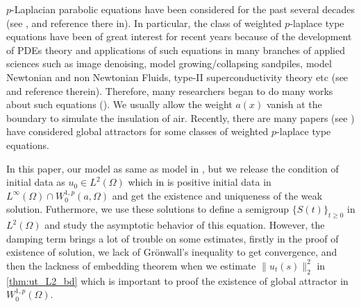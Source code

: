 \documentclass[11pt]{amsart}
\theoremstyle{definition}
\numberwithin{equation}{section}
\newcommand*\norm[1]{\lVert#1\rVert}
\newcommand*\Brace[1]{\lbrace#1\rbrace}
\begin{document}
$p$-Laplacian parabolic equations have been considered for the past several decades
(see \autocite{liuAsymptoticRegularityPLaplacian2010,zhongZ2IndexGlobal2010,acerbiRegularityResultsStationary2002,rajagopalMathematicalModelingElectrorheological2001,aboulaichNewDiffusionModels2008,guoSingularPhenomenaSolutions2015,antontsevUniquenessComparisonTheorems2013,gaoExistenceUniquenessNonexistence2016,liuNonlinearDiffusionProblem2019,guoStudyWeakSolutions2011,antontsevParabolicEquationsAnisotropic2007,constantinGlobalExistenceFully2006,constantinGlobalSolutionsQuasilinear2002},
and reference there in).
In particular, the class of weighted $p$-laplace type equations have been of great interest for recent years
because of the development of PDEs theory and applications of such equations in
many branches of applied sciences such as image
denoising, model growing/collapsing sandpiles,
model Newtonian and non Newtonian Fluids, type-II superconductivity theory etc
(see \autocite{aronssonFastSlowDiffusion1996,aubertMathematicalProblemsImage2006,mastorakisSolutionPLaplacianNonNewtonian2009,yinLaplacianTypeEvolution2001} and reference therein).
Therefore, many researchers began to do many works about such equations
(\autocite{cortazarExistenceSignChanging2014,musinaExistenceMultiplicityResults2009,gazziniSobolevtypeInequalityRelated2009,liLongtimeBehaviorClass2014b,maGlobalAttractorsWeighted2012a,cavalheiroWeightedSobolevSpaces2008,caldiroliVariationalDegenerateElliptic2000,leBoundaryValueProblems1998,monticelliMaximumPrinciplesWeak2009,dibenedettoDegenerateSingularParabolic1993,galClassDegenerateParabolic2012,yinEvolutionaryWeightedPLaplacian2007,Zhan2019Uniquenessa}).
We usually allow the weight $a(x)$ vanish at the boundary to simulate the
insulation of air. Recently, there are many papers
(see \autocite{anhGlobalExistenceLongtime2008,anhGlobalAttractorMsemiflow2010,anhLongtimeBehaviorQuasilinear2009,karachaliosConvergenceAttractorsDegenerate2005,karachaliosDynamicsDegenerateParabolic2006,karachaliosGlobalAttractorsConvergence2005})
have considered global attractors for some classes of weighted $p$-laplace type equations.

In this paper, our model as same as model in \autocite{Zhan2019Uniquenessa},
but we release the condition of initial data as
$u_0 \in L^2(\Omega)$ which in \autocite{Zhan2019Uniquenessa} is
positive initial data in $L^{\infty}(\Omega) \cap W_0^{1,p}(a,\Omega)$
and get the existence and
uniqueness of the weak solution. Futhermore, we use
these solutions to define a semigroup $\Brace{S(t)}_{t \geq 0} $ in $L^2(\Omega) $ and study the asymptotic behavior of this equation. However,
the damping term brings a lot of trouble on some estimates, firstly in
the proof of existence of solution, we lack of Gr\"onwall's inequality
to get convergence, and then the lackness of embedding theorem when we
estimate $\norm{u_t(s)}_2^2$ in \cref{thm:ut_L2_bd} which is important
to proof the existence of global attractor in $W_0^{1,p}(\Omega)$.
\end{document}
